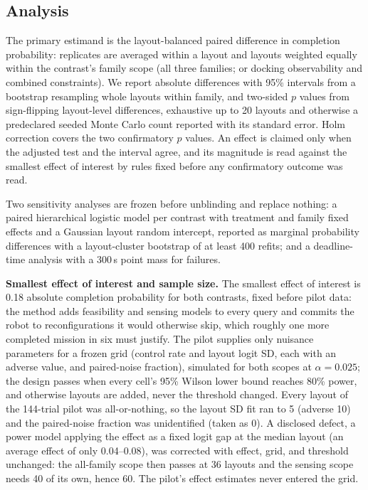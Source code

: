 \documentclass[conference]{IEEEtran}
\begin{document}
\subsection{Analysis}
The primary estimand is the layout-balanced paired difference in completion probability: replicates are averaged within a layout and layouts weighted equally within the contrast's family scope (all three families; or docking observability and combined constraints). We report absolute differences with 95\% intervals from a bootstrap resampling whole layouts within family, and two-sided $p$ values from sign-flipping layout-level differences, exhaustive up to 20 layouts and otherwise a predeclared seeded Monte Carlo count reported with its standard error. Holm correction covers the two confirmatory $p$ values. An effect is claimed only when the adjusted test and the interval agree, and its magnitude is read against the smallest effect of interest by rules fixed before any confirmatory outcome was read.

Two sensitivity analyses are frozen before unblinding and replace nothing: a paired hierarchical logistic model per contrast with treatment and family fixed effects and a Gaussian layout random intercept, reported as marginal probability differences with a layout-cluster bootstrap of at least 400 refits; and a deadline-time analysis with a 300\,s point mass for failures.

\textbf{Smallest effect of interest and sample size.} The smallest effect of interest is 0.18 absolute completion probability for both contrasts, fixed before pilot data: the method adds feasibility and sensing models to every query and commits the robot to reconfigurations it would otherwise skip, which roughly one more completed mission in six must justify. The pilot supplies only nuisance parameters for a frozen grid (control rate and layout logit SD, each with an adverse value, and paired-noise fraction), simulated for both scopes at $\alpha = 0.025$; the design passes when every cell's 95\% Wilson lower bound reaches 80\% power, and otherwise layouts are added, never the threshold changed. Every layout of the 144-trial pilot was all-or-nothing, so the layout SD fit ran to 5 (adverse 10) and the paired-noise fraction was unidentified (taken as 0). A disclosed defect, a power model applying the effect as a fixed logit gap at the median layout (an average effect of only 0.04--0.08), was corrected with effect, grid, and threshold unchanged: the all-family scope then passes at 36 layouts and the sensing scope needs 40 of its own, hence 60. The pilot's effect estimates never entered the grid.
\end{document}
